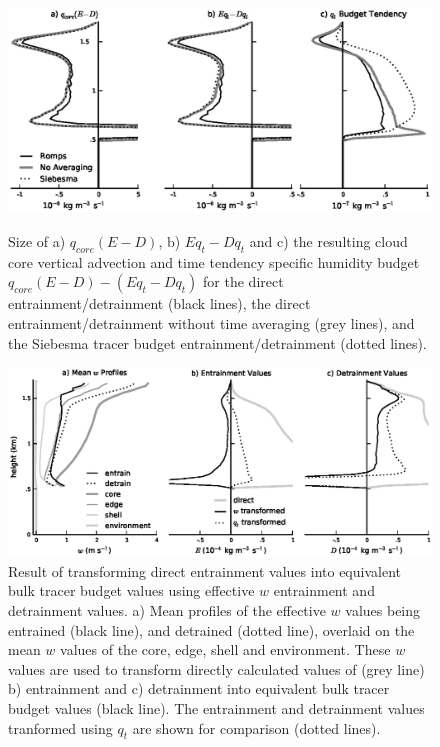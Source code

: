 \documentclass[12pt]{article}
\begin{document}
\begin{figure}[t]
  \noindent\includegraphics[width=39pc]{./figures/numerical_error}\\
  \caption{Size of a) $q_{core}(E-D)$, b) $Eq_t-Dq_t$ and c) the resulting 
  cloud core vertical advection and time tendency specific humidity budget 
  $q_{core}(E-D) - (Eq_t-Dq_t)$ for the direct entrainment/detrainment 
  (black lines), the direct entrainment/detrainment without time averaging 
  (grey lines), and the Siebesma tracer budget entrainment/detrainment 
  (dotted lines).}
  \label{fig:numerical_error}
\end{figure}

\begin{figure}[t]
  \noindent\includegraphics[width=39pc]{./figures/reynolds_correction_w}
  \caption{Result of transforming direct entrainment values into equivalent 
  bulk tracer budget values using effective $w$ entrainment and detrainment 
  values.  a) Mean profiles of the effective $w$ values being entrained 
  (black line), and detrained (dotted line), overlaid on the mean $w$ values 
  of the core, edge, shell and environment.  These $w$ values are used to
  transform directly calculated values of (grey line) b) entrainment and 
  c) detrainment into equivalent bulk tracer budget values (black line).  The  
  entrainment and detrainment values tranformed using $q_t$ are shown for
  comparison (dotted lines).}
  \label{fig:Reynolds_correction_w}
\end{figure}
\end{document}
